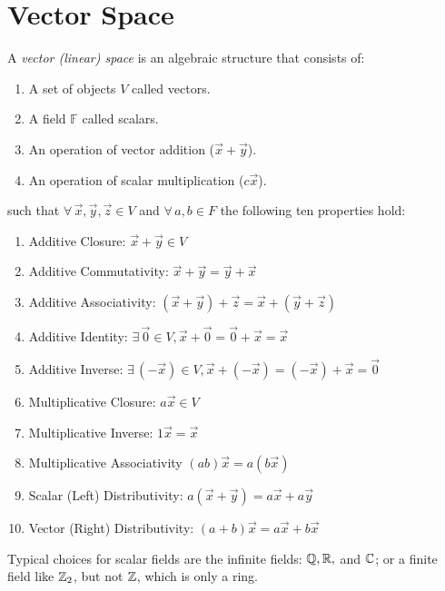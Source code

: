\documentclass[letterpaper,12pt,fleqn]{article}
\newcommand{\vx}{\vec{x}}
\newcommand{\vy}{\vec{y}}
\newcommand{\vz}{\vec{z}}
\newcommand{\vi}{\vec{0}}
\newcommand{\F}{\mathbb{F}}
\begin{document}
\section*{Vector Space}

\begin{definition}
  A \emph{vector (linear) space} is an algebraic structure that consists of:
  \begin{enumerate}
  \item A set of objects $V$ called vectors.
  \item A field $\F$ called scalars.
  \item An operation of vector addition ($\vx+\vy$).
  \item An operation of scalar multiplication ($c\vx$).
  \end{enumerate}
  such that $\forall\,\vx,\vy,\vz\in V$ and $\forall\,a,b\in F$ the following ten
  properties hold:
  \begin{enumerate}
  \item Additive Closure: $\vx+\vy\in V$
  \item Additive Commutativity: $\vx+\vy=\vy+\vx$
  \item Additive Associativity: $(\vx+\vy)+\vz=\vx+(\vy+\vz)$
  \item Additive Identity: $\exists\,\vi\in V,\vx+\vi=\vi+\vx=\vx$
  \item Additive Inverse: $\exists\,(-\vx)\in V,\vx+(-\vx)=(-\vx)+\vx=\vi$
  \item Multiplicative Closure: $a\vx\in V$
  \item Multiplicative Inverse: $1\vx=\vx$
  \item Multiplicative Associativity $(ab)\vx=a(b\vx)$
  \item Scalar (Left) Distributivity: $a(\vx+\vy)=a\vx+a\vy$
  \item Vector (Right) Distributivity: $(a+b)\vx=a\vx+b\vx$
  \end{enumerate}
\end{definition}

Typical choices for scalar fields are the infinite fields: $\mathbb{Q}, \mathbb{R},$ and $\mathbb{C}$; or a finite
field like $\mathbb{Z}_2$, but not $\mathbb{Z}$, which is only a ring.
\end{document}
